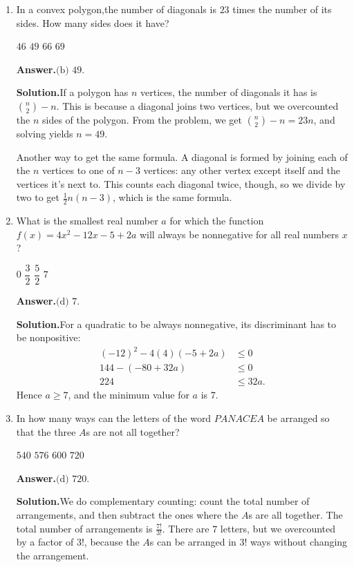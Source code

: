 \documentclass[11pt,paper=letter]{scrartcl}
\newcommand{\ansb}[2]{{\sffamily \bfseries Answer.}\;\(\boxed{\text{(#1) #2}}\).}
\newcommand{\sol}{{\sffamily \bfseries Solution.}\;}
\newenvironment{rem}%
{\noindent \ignorespaces \small \sffamily \sansmath {\bfseries Remark.}}%
{\ignorespacesafterend}
\begin{document}
\begin{enumerate}[align=left,leftmargin=*]

\item In a convex polygon,the number of diagonals is $23$ times the number of its sides. How many sides does it have?

\fourch
{$46$}
{$49$}
{$66$}
{$69$}

\ansb{b}{$49$}

\sol If a polygon has $n$ vertices, the number of diagonals it has is $\binom{n}{2} - n$. This is because a diagonal joins two vertices, but we overcounted the $n$ sides of the polygon. From the problem, we get $\binom{n}{2} - n = 23n$, and solving yields $n = 49$.

\begin{rem}
Another way to get the same formula. A diagonal is formed by joining each of the $n$ vertices to one of $n - 3$ vertices: any other vertex except itself and the vertices it's next to. This counts each diagonal twice, though, so we divide by two to get $\frac{1}{2}n(n-3)$, which is the same formula.
\end{rem}

\item What is the smallest real number $a$ for which the function $f(x) = 4x^2 - 12x - 5 + 2a$ will always be nonnegative for all real numbers $x$?

\fourch
{$0$}
{$\dfrac{3}{2}$}
{$\dfrac{5}{2}$}
{$7$}

\ansb{d}{$7$}

\sol For a quadratic to be always nonnegative, its discriminant has to be nonpositive:
\begin{align*}
(-12)^2 - 4(4)(-5 + 2a) &\le 0 \\
144 - (-80 + 32a) &\le 0 \\
224 &\le 32a.
\end{align*}
Hence $a \ge 7$, and the minimum value for $a$ is $7$.

\item In how many ways can the letters of the word $PANACEA$ be arranged so that the three $A$s are not all together?

\fourch
{$540$}
{$576$}
{$600$}
{$720$}

\ansb{d}{$720$}

\sol We do complementary counting: count the total number of arrangements, and then subtract the ones where the $A$s are all together. The total number of arrangements is $\frac{7!}{3!}$. There are $7$ letters, but we overcounted by a factor of $3!$, because the $A$s can be arranged in $3!$ ways without changing the arrangement.


\end{enumerate}
\end{document}
